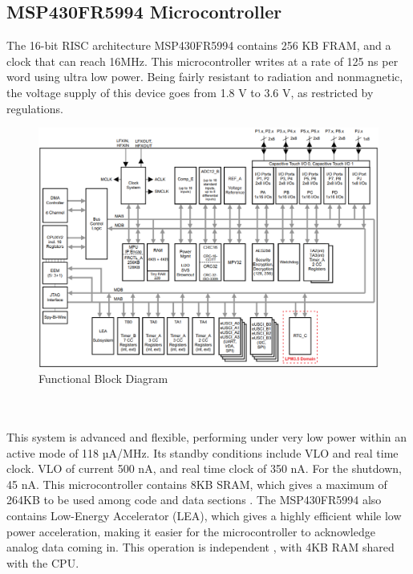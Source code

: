 \documentclass[12pt]{article}
\begin{document}
\subsection{MSP430FR5994 Microcontroller}
\indent \indent
The 16-bit RISC architecture MSP430FR5994 contains 256 KB FRAM, and a clock that can reach 16MHz. This microcontroller writes at a rate of 125 ns per word using ultra low power. Being fairly resistant to radiation and nonmagnetic, the voltage supply of this device goes from 1.8 V to 3.6 V, as restricted by regulations. \cite{testKit} \\
\hfill
\begin{figure}[h!]
\centering
\includegraphics[width=1.0\linewidth]{micro_processor_funct_diagram}
\caption{Functional Block Diagram \cite{MSP430FR599x}}
\end{figure}\\
\hfill \\
\indent
This system is advanced and flexible, performing under very low power within an active mode of 118 µA/MHz. Its standby conditions include VLO and real time clock. VLO of current 500 nA, and real time clock of 350 nA. For the shutdown, 45 nA. This microcontroller contains 8KB SRAM, which gives a maximum of 264KB to be used among code and data sections \cite{testKit}. The MSP430FR5994 also contains Low-Energy Accelerator (LEA), which gives a highly efficient while low power acceleration, making it easier for the microcontroller to acknowledge analog data coming in. This operation is independent , with 4KB RAM shared with the CPU. \cite{MSP430FR599x} \\
\hfill \\
\pagebreak
\hfill \\
\end{document}
